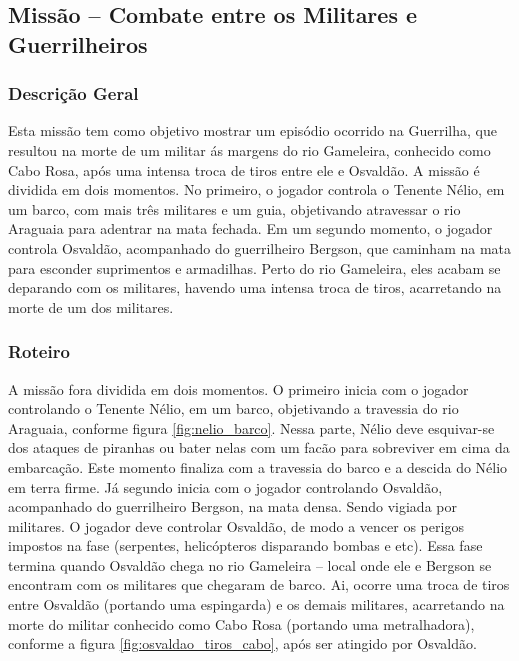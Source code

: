 \subsection{Missão -- Combate entre os Militares e Guerrilheiros}

\subsubsection{Descrição Geral}

Esta missão tem como objetivo mostrar um episódio ocorrido na Guerrilha, que resultou na morte de um militar ás margens do rio Gameleira, conhecido como Cabo Rosa, após uma intensa troca de tiros entre ele e Osvaldão. A missão é dividida em dois momentos. No primeiro, o jogador controla o Tenente Nélio, em um barco, com mais três militares e um guia, objetivando atravessar o rio Araguaia para adentrar na mata fechada. Em um segundo momento, o jogador controla Osvaldão, acompanhado do guerrilheiro Bergson, que caminham na mata para esconder suprimentos e armadilhas. Perto do rio Gameleira, eles acabam se deparando com os militares, havendo uma intensa troca de tiros, acarretando na morte de um dos militares.

\subsubsection{Roteiro}

A missão fora dividida em dois momentos. O primeiro inicia com o jogador controlando o Tenente Nélio, em um barco, objetivando a travessia do rio Araguaia, conforme figura \ref{fig:nelio_barco}. Nessa parte, Nélio deve esquivar-se dos ataques de piranhas ou bater nelas com um facão para sobreviver em cima da embarcação. Este momento finaliza com a travessia do barco e a descida do Nélio em terra firme. Já segundo inicia com o jogador controlando Osvaldão, acompanhado do guerrilheiro Bergson, na mata densa. Sendo vigiada por militares. O jogador deve controlar Osvaldão, de modo a vencer os perigos impostos na fase (serpentes, helicópteros disparando bombas e etc). Essa fase termina quando Osvaldão chega no rio Gameleira -- local onde ele e Bergson se encontram com os militares que chegaram de barco. Ai, ocorre uma troca de tiros entre Osvaldão (portando uma espingarda) e os demais militares, acarretando na morte do militar conhecido como Cabo Rosa (portando uma metralhadora), conforme a figura \ref{fig:osvaldao_tiros_cabo}, após ser atingido por Osvaldão.

